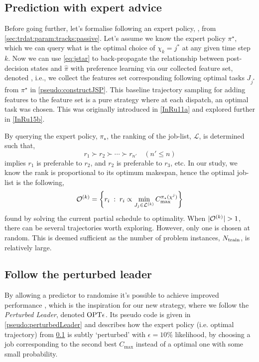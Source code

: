\subsection{Prediction with expert advice}\label{sec:expertPolicy}
Before going further, let's formalise following an expert policy, 
\PhiSet{\OPT}, from \cref{sec:trdat:param:tracks:passive}.
Let's assume we know the expert policy $\pi^\star$, which we can query what 
is the optimal choice of $\chi_k={j^*}$ at any given time step $k$. 
Now we can use \cref{eq:jstar} to back-propagate the relationship between 
post-decision states and $\hat{\pi}$ with preference learning via our collected 
feature set, denoted \PhiSet{\OPT}, i.e., we collect the features set 
corresponding following optimal tasks $J_{j^*}$ from $\pi^\star$ in 
\cref{pseudo:constructJSP}.
This baseline trajectory sampling for adding features to the feature set 
is a pure strategy where at each dispatch, an optimal task was chosen.
This was originally introduced in \cref{InRu11a} and explored further in 
\cref{InRu15b}. 

By querying the expert policy, $\pi_\star$, the ranking of the job-list, 
$\mathcal{L}$, is determined such that,
\begin{equation}
r_1 \succ r_2 \succ \cdots \succ r_{n'} \quad (n' \leq n)
\end{equation}
implies $r_1$  is preferable to $r_2$, and $r_2$ is preferable to $r_3$, etc. 
In  our study, we know the rank is proportional to its optimum makespan, hence 
the optimal job-list is the following, 
\begin{equation}
\mathcal{O}^{(k)}=\left\{r_i\;:\;r_i \propto \min_{J_j \in \mathcal{L}^{(k)}}
    C_{\max}^{\pi_\star({\mathbf{\chi}}^j)}\right\}
\end{equation}
found by solving the current partial schedule to optimality.
When $\lvert\mathcal{O}^{(k)}\rvert>1$, there can be several trajectories worth 
exploring. However, only one is chosen at random. This is deemed sufficient as 
the number of problem instances, $N_{\text{train}}$, is relatively large.

\subsection{Follow the perturbed leader}\label{sec:perturbedLeader}
By allowing a predictor to randomise it's possible to achieve improved 
performance \citep{CesaBianchi06,Hannan57}, which is the inspiration for our 
new strategy, where we follow the \emph{Perturbed Leader}, denoted 
$\text{OPT}\epsilon$. 
Its pseudo code is given in \cref{pseudo:perturbedLeader} and describes how the 
expert policy (i.e. optimal trajectory) from \cref{sec:expertPolicy} is subtly
`perturbed' with $\epsilon=10\%$ likelihood, by choosing a job corresponding 
to the second best $C_{\max}$ instead of a optimal one with some small 
probability. 

